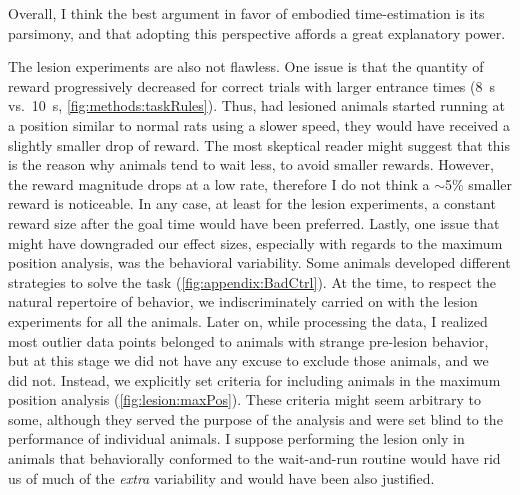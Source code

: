 Overall, I think the best argument in favor of embodied time-estimation is its parsimony, and that adopting this perspective affords a great explanatory power.
\par
The lesion experiments are also not flawless.
One issue is that the quantity of reward progressively decreased for correct trials with larger entrance times (8~s vs.\ 10~s, \autoref{fig:methods:taskRules}).
Thus, had lesioned animals started running at a position similar to normal rats using a slower speed, they would have received a slightly smaller drop of reward.
The most skeptical reader might suggest that this is the reason why animals tend to wait less, to avoid smaller rewards.
However, the reward magnitude drops at a low rate, therefore I do not think a $\sim$5\% smaller reward is noticeable.
In any case, at least for the lesion experiments, a constant reward size after the goal time would have been preferred.
Lastly, one issue that might have downgraded our effect sizes, especially with regards to the maximum position analysis, was the behavioral variability.
Some animals developed different strategies to solve the task (\autoref{fig:appendix:BadCtrl}).
At the time, to respect the natural repertoire of behavior, we indiscriminately carried on with the lesion experiments for all the animals.
Later on, while processing the data, I realized most outlier data points belonged to animals with strange pre-lesion behavior, but at this stage we did not have any excuse to exclude those animals, and we did not.
Instead, we explicitly set criteria for including animals in the maximum position analysis (\autoref{fig:lesion:maxPos}).
These criteria might seem arbitrary to some, although they served the purpose of the analysis and were set blind to the performance of individual animals.
I suppose performing the lesion only in animals that behaviorally conformed to the wait-and-run routine would have rid us of much of the \textit{extra} variability and would have been also justified.


